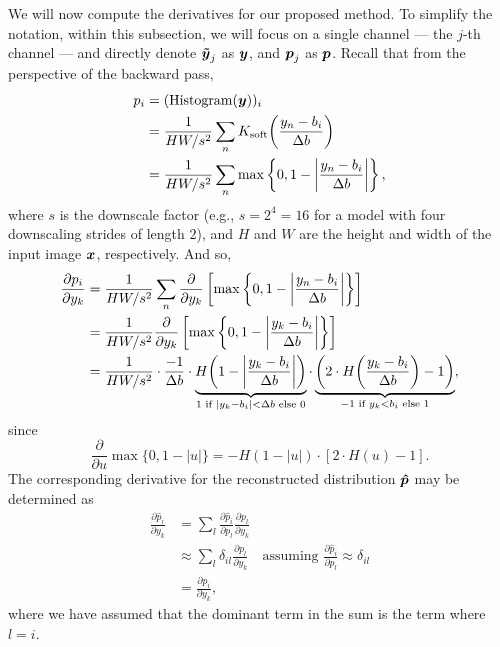 We will now compute the derivatives for our proposed method.
To simplify the notation, within this subsection, we will focus on a single channel --- the $j$-th channel --- and directly denote ${\boldsymbol{\tilde{y}}}_j$ as ${\boldsymbol{y}}$, and ${\boldsymbol{p}}_j$ as ${\boldsymbol{p}}$.
Recall that from the perspective of the backward pass,
%
\begin{equation*}
  \begin{split}
    p_i
    &= (\operatorname{Histogram}({\boldsymbol{y}}))_i \\
    &= \frac{1}{H W / s^2}
      \sum_n K_{\mathrm{soft}}{\left(\frac{y_n - b_i}{\Delta b}\right)} \\
    &= \frac{1}{H W / s^2}
      \sum_n \max \left\{ 0, 1 - \left| \frac{y_n - b_i}{\Delta b} \right| \right\},
  \end{split}
\end{equation*}
%
where $s$ is the downscale factor (e.g., $s = 2^4 = 16$ for a model with four downscaling strides of length $2$), and $H$ and $W$ are the height and width of the input image ${\boldsymbol{x}}$, respectively.
And so,
%
\begin{equation*}
  \begin{split}
    \frac{\partial p_i}{\partial y_k}
    &= \frac{1}{H W / s^2}
      \sum_n \frac{\partial}{\partial y_k} \left[
        \max \left\{ 0, 1 - \left| \frac{y_n - b_i}{\Delta b} \right| \right\}
      \right] \\
    &= \frac{1}{H W / s^2}
      \frac{\partial}{\partial y_k} \left[
        \max \left\{ 0, 1 - \left| \frac{y_k - b_i}{\Delta b} \right| \right\}
      \right] \\
    &= \frac{1}{H W / s^2} \cdot
      \frac{-1}{\Delta b} \cdot
      \underbrace{%
        H{\left( 1 - \left| \frac{y_k - b_i}{\Delta b} \right| \right)}
      }_{1 \text{ if } |y_k - b_i| < \Delta b \text{ else } 0}
      \cdot
      \underbrace{%
        \left( 2 \cdot H{\left( \frac{y_k - b_i}{\Delta b} \right)} - 1 \right)
      }_{-1 \text{ if } y_k < b_i \text{ else } 1},
  \end{split}
\end{equation*}
%
since
%
\begin{equation*}
  \frac{\partial}{\partial u} \max \{ 0, 1 - |u| \}
  = - H(1 - |u|) \cdot [2 \cdot H(u) - 1].
\end{equation*}
%
The corresponding derivative for the reconstructed distribution ${\boldsymbol{\hat{p}}}$ may be determined as
%
\begin{equation*}
  \begin{split}
    \frac{\partial \hat{p}_i}{\partial y_k}
    &= \sum_l
      \frac{\partial \hat{p}_i}{\partial p_l}
      \frac{\partial p_l}{\partial y_k}
    \\
    &\approx \sum_l
      \delta_{il}
      \frac{\partial p_l}{\partial y_k}
      \quad \text{assuming } \frac{\partial \hat{p}_i}{\partial p_l} \approx \delta_{il}
    \\
    &= \frac{\partial p_i}{\partial y_k},
  \end{split}
\end{equation*}
where we have assumed that the dominant term in the sum is the term where $l = i$.

